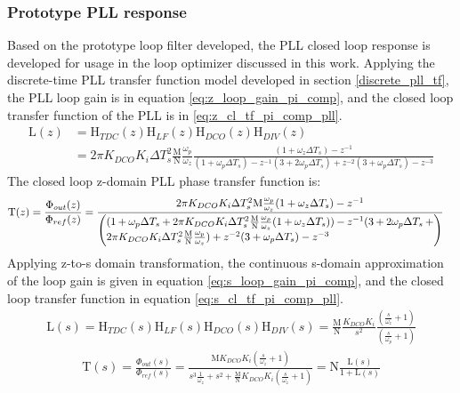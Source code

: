 		\subsubsection{Prototype PLL response}\label{proto_pll_tfs}
		Based on the prototype loop filter developed, the PLL closed loop response is developed for usage in the loop optimizer discussed in this work. Applying the discrete-time PLL transfer function model developed in section \ref{discrete_pll_tf}, the PLL loop gain is in equation \ref{eq:z_loop_gain_pi_comp}, and the closed loop transfer function of the PLL is in \ref{eq:z_cl_tf_pi_comp_pll}.
		\begin{align}
			\mathrm{L}(z) &= \mathrm{H}_{TDC}(z)\mathrm{H}_{LF}(z)\mathrm{H}_{DCO}(z)\mathrm{H}_{DIV}(z) \\
			&= 2\pi K_{DCO}K_i\Delta T_s^2\frac{\mathrm{M}}{\mathrm{N}}\frac{\omega_p}{\omega_z}\frac{(1+\omega_z\Delta T_s)-z^{-1}}{(1+\omega_p\Delta T_s) - z^{-1}(3+2\omega_p\Delta T_s) + z^{-2}(3+\omega_p\Delta T_s) - z^{-3}}\label{eq:z_loop_gain_pi_comp}
		\end{align}
		The closed loop z-domain PLL phase transfer function is:
		\begin{align}\label{eq:z_cl_tf_pi_comp_pll}
			\mathrm{T}(z) = \frac{\Phi_{out}(z)}{\Phi_{ref}(z)} &= \frac{2\pi K_{DCO}K_i\Delta T_s^2\mathrm{M}\frac{\omega_p}{\omega_z}(1+\omega_z\Delta T_s)-z^{-1}}{\left(\parbox{4.2in}{$(1+\omega_p\Delta T_s + 2\pi K_{DCO}K_i\Delta T_s^2\frac{\mathrm{M}}{\mathrm{N}}\frac{\omega_p}{\omega_z}(1+\omega_z\Delta T_s))- z^{-1}(3+2\omega_p\Delta T_s+2\pi K_{DCO}K_i\Delta T_s^2\frac{\mathrm{M}}{\mathrm{N}}\frac{\omega_p}{\omega_z})+ z^{-2}(3+\omega_p\Delta T_s) - z^{-3}$}\right)}%
		\end{align}
		Applying z-to-s domain transformation, the continuous s-domain approximation of the loop gain is given in equation \ref{eq:s_loop_gain_pi_comp}, and the closed loop transfer function in equation \ref{eq:s_cl_tf_pi_comp_pll}.
		\begin{align}
			\mathrm{L}(s) = \mathrm{H}_{TDC}(s)\mathrm{H}_{LF}(s)\mathrm{H}_{DCO}(s)\mathrm{H}_{DIV}(s) = \frac{\mathrm{M}}{\mathrm{N}}\frac{K_{DCO}K_i}{s^2} \frac{\left(\frac{s}{\omega_z} + 1\right)}{\left(\frac{s}{\omega_p} + 1\right)}\label{eq:s_loop_gain_pi_comp}
		\end{align}
		\begin{align}\label{eq:s_cl_tf_pi_comp_pll}
			\mathrm{T}(s)=\frac{\Phi_{out}(s)}{\Phi_{ref}(s)} = \frac{\mathrm{M}K_{DCO}K_i\left(\frac{s}{\omega_z} + 1\right)}{s^3\frac{1}{\omega_z} + s^2 + \frac{\mathrm{M}}{\mathrm{N}}K_{DCO}K_i\left(\frac{s}{\omega_z} + 1\right)} = \mathrm{N}\frac{\mathrm{L}(s)}{1+\mathrm{L}(s)} 
		\end{align}



